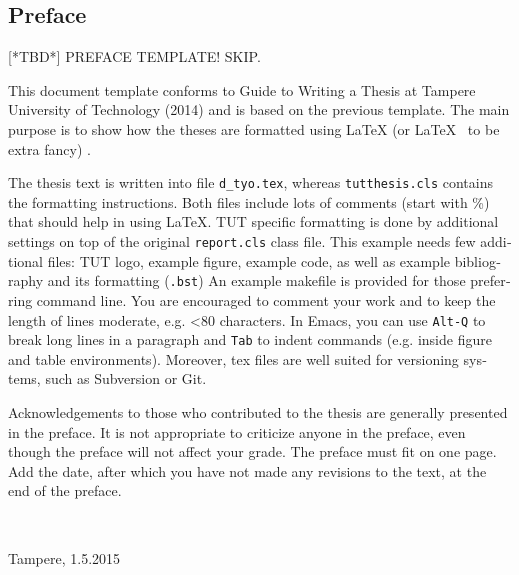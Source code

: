 \documentclass[12pt,a4paper,english]{tutthesis}
\begin{document}
\begin{otherlanguage}{english} %
\makeatother %

%
%
\chapter*{Preface}

[*TBD*]
PREFACE TEMPLATE! SKIP.

This document template conforms to Guide to Writing a Thesis at
Tampere University of Technology (2014) and is based on the previous
template. The main purpose is to show how the theses are formatted
using LaTeX (or \LaTeX ~ to be extra fancy) .


The thesis text is written into file \texttt{d\_tyo.tex}, whereas
\texttt{tutthesis.cls} contains the formatting instructions. Both
files include lots of comments (start with \%) that should help in
using LaTeX. TUT specific formatting is done by additional settings on
top of the original \texttt{report.cls} class file. This example needs
few additional files: TUT logo, example figure, example code, as well
as example bibliography and its formatting (\texttt{.bst}) An example
makefile is provided for those preferring command line. You are
encouraged to comment your work and to keep the length of lines
moderate, e.g. <80 characters. In Emacs, you can use \texttt{Alt-Q} to
break long lines in a paragraph and \texttt{Tab} to indent commands
(e.g. inside figure and table environments). Moreover, tex files are
well suited for versioning systems, such as Subversion or Git.  

Acknowledgements to those who contributed to the thesis are generally
presented in the preface. It is not appropriate to criticize anyone in
the preface, even though the preface will not affect your grade. The
preface must fit on one page. Add the date, after which you have not
made any revisions to the text, at the end of the preface.

~ 

Tampere, 1.5.2015
~



\end{otherlanguage}
\end{document}
